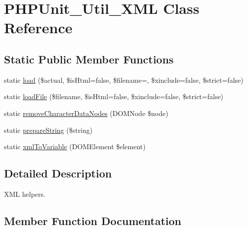 \hypertarget{class_p_h_p_unit___util___x_m_l}{}\section{P\+H\+P\+Unit\+\_\+\+Util\+\_\+\+X\+ML Class Reference}
\label{class_p_h_p_unit___util___x_m_l}
\subsection*{Static Public Member Functions}
\begin{DoxyCompactItemize}
\item 
static \mbox{\hyperlink{class_p_h_p_unit___util___x_m_l_a59b1c5f6d9c05f3971004237935f257b}{load}} (\$actual, \$is\+Html=false, \$filename=\textquotesingle{}\textquotesingle{}, \$xinclude=false, \$strict=false)
\item 
static \mbox{\hyperlink{class_p_h_p_unit___util___x_m_l_a6ae13affc8cf80041fb57a274631fba5}{load\+File}} (\$filename, \$is\+Html=false, \$xinclude=false, \$strict=false)
\item 
static \mbox{\hyperlink{class_p_h_p_unit___util___x_m_l_a2c80608cf99e22685634885c94930eab}{remove\+Character\+Data\+Nodes}} (D\+O\+M\+Node \$node)
\item 
static \mbox{\hyperlink{class_p_h_p_unit___util___x_m_l_a10eb5357ad761c10be65337073d38d4b}{prepare\+String}} (\$string)
\item 
static \mbox{\hyperlink{class_p_h_p_unit___util___x_m_l_a907699a2aab1dd40c7233e619e2534b0}{xml\+To\+Variable}} (D\+O\+M\+Element \$element)
\end{DoxyCompactItemize}


\subsection{Detailed Description}
X\+ML helpers. 

\subsection{Member Function Documentation}
\mbox{\label{class_p_h_p_unit___util___x_m_l_a59b1c5f6d9c05f3971004237935f257b}} 
